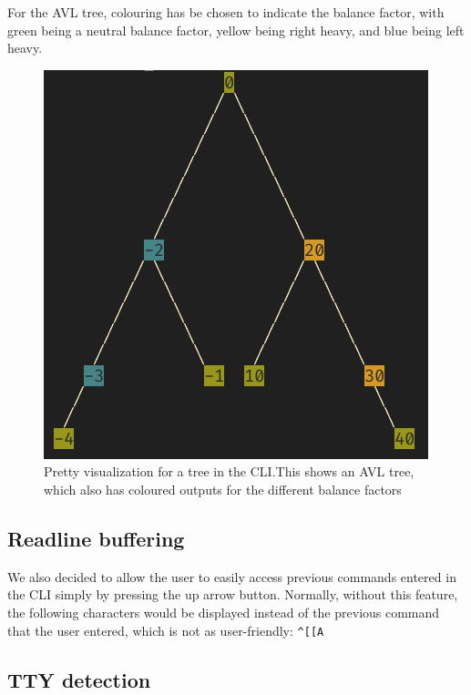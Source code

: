 \documentclass[letterpaper]{article}
\begin{document}
For the AVL tree, colouring has be chosen to indicate the balance
factor, with green being a neutral balance factor, yellow being right
heavy, and blue being left heavy.

\begin{figure}[H]
      \centering
      \includegraphics[width=.8\textwidth]{avl.png}
      \caption{Pretty visualization for a tree in the CLI.\@ This shows an AVL
      tree, which also has coloured outputs for the different balance factors}
\end{figure}


\subsection{Readline buffering}
We also decided to allow the user to easily access previous commands entered in
the CLI simply by pressing the up arrow button. Normally, without this feature,
the following characters would be displayed instead of the previous command that
the user entered, which is not as user-friendly:
\verb|^[[A|

\subsection{TTY detection}
\end{document}

